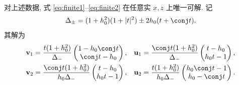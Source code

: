 \begin{lemma}[一轨道留数系统的显式消元]\label{lem:direct-solve}
对上述数据, 式 \eqref{eq:finite1}--\eqref{eq:finite2} 在任意实 $x,z$ 上唯一可解. 记
\begin{equation}\label{eq:delta-pair}
\Delta_\pm=(1+h_0^2)(1+|t|^2)\pm2h_0(t+\conj t).
\end{equation}
其解为
\begin{align}
\mathbf v_1&=\dfrac{t(1+h_0^2)}{\Delta_-}
\begin{pmatrix}1-h_0\conj t\\\conj t-h_0\end{pmatrix},&
\mathbf u_1&=\dfrac{\conj t(1+h_0^2)}{\Delta_-}
\begin{pmatrix}t-h_0\\h_0t-1\end{pmatrix},\label{eq:direct-vu1}\\
\mathbf v_2&=\dfrac{\conj t(1+h_0^2)}{h_0\Delta_-}
\begin{pmatrix}t-h_0\\h_0t-1\end{pmatrix},&
\mathbf u_2&=\dfrac{t(1+h_0^2)}{h_0\Delta_-}
\begin{pmatrix}h_0\conj t-1\\h_0-\conj t\end{pmatrix}.\label{eq:direct-vu2}
\end{align}
\end{lemma}
